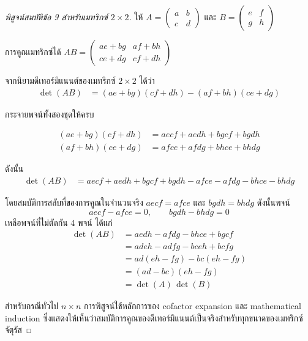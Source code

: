 \begin{proof}[พิสูจน์สมบัติข้อ 9 สำหรับเมทริกซ์ $2 \times 2$]
ให้ $A = \begin{pmatrix} a & b \\ c & d \end{pmatrix}$ และ $B = \begin{pmatrix} e & f \\ g & h \end{pmatrix}$

การคูณเมทริกซ์ได้ $AB = \begin{pmatrix} ae+bg & af+bh \\ ce+dg & cf+dh \end{pmatrix}$

จากนิยามดีเทอร์มิแนนต์ของเมทริกซ์ $2\times 2$ ได้ว่า
\begin{align*}
\det(AB) &= (ae+bg)(cf+dh) - (af+bh)(ce+dg)
\end{align*}

กระจายพจน์ทั้งสองชุดให้ครบ

\begin{align*}
(ae+bg)(cf+dh) &= aecf + aedh + bgcf + bgdh \\
(af+bh)(ce+dg) &= afce + afdg + bhce + bhdg
\end{align*}

ดังนั้น
\begin{align*}
\det(AB) &= aecf + aedh + bgcf + bgdh - afce - afdg - bhce - bhdg
\end{align*}

โดยสมบัติการสลับที่ของการคูณในจำนวนจริง $aecf = afce$ และ $bgdh = bhdg$ ดังนั้นพจน์
\[
aecf - afce = 0, \qquad bgdh - bhdg = 0
\]
เหลือพจน์ที่ไม่ตัดกัน 4 พจน์ ได้แก่
\begin{align*}
\det(AB) &= aedh - afdg - bhce + bgcf \\
&= adeh - adfg - bceh + bcfg \\
&= ad(eh - fg) - bc(eh - fg) \\
&= (ad - bc)(eh - fg) \\
&= \det(A)\,\det(B)
\end{align*}

สำหรับกรณีทั่วไป $n \times n$ การพิสูจน์ใช้หลักการของ cofactor expansion และ mathematical induction ซึ่งแสดงให้เห็นว่าสมบัติการคูณของดีเทอร์มิแนนต์เป็นจริงสำหรับทุกขนาดของเมทริกซ์จัตุรัส
\end{proof}

